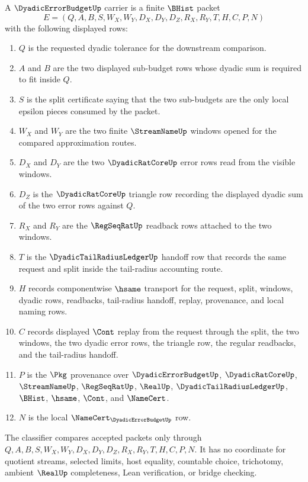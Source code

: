 \begin{definition}
\label{def:dyadic-error-budget-carrier}
A $\DyadicErrorBudgetUp$ carrier is a finite $\BHist$ packet
$$
E=(Q,A,B,S,W_X,W_Y,D_X,D_Y,D_Z,R_X,R_Y,T,H,C,P,N)
$$
with the following displayed rows:
\begin{enumerate}
\item $Q$ is the requested dyadic tolerance for the downstream comparison.
\item $A$ and $B$ are the two displayed sub-budget rows whose dyadic sum is required to fit inside $Q$.
\item $S$ is the split certificate saying that the two sub-budgets are the only local epsilon pieces consumed by the packet.
\item $W_X$ and $W_Y$ are the two finite $\StreamNameUp$ windows opened for the compared approximation routes.
\item $D_X$ and $D_Y$ are the two $\DyadicRatCoreUp$ error rows read from the visible windows.
\item $D_Z$ is the $\DyadicRatCoreUp$ triangle row recording the displayed dyadic sum of the two error rows against $Q$.
\item $R_X$ and $R_Y$ are the $\RegSeqRatUp$ readback rows attached to the two windows.
\item $T$ is the $\DyadicTailRadiusLedgerUp$ handoff row that records the same request and split inside the tail-radius accounting route.
\item $H$ records componentwise $\hsame$ transport for the request, split, windows, dyadic rows, readbacks, tail-radius handoff, replay, provenance, and local naming rows.
\item $C$ records displayed $\Cont$ replay from the request through the split, the two windows, the two dyadic error rows, the triangle row, the regular readbacks, and the tail-radius handoff.
\item $P$ is the $\Pkg$ provenance over $\DyadicErrorBudgetUp$, $\DyadicRatCoreUp$, $\StreamNameUp$, $\RegSeqRatUp$, $\RealUp$, $\DyadicTailRadiusLedgerUp$, $\BHist$, $\hsame$, $\Cont$, and $\NameCert$.
\item $N$ is the local $\NameCert_{\DyadicErrorBudgetUp}$ row.
\end{enumerate}
The classifier compares accepted packets only through $Q,A,B,S,W_X,W_Y,D_X,D_Y,D_Z,R_X,R_Y,T,H,C,P,N$. It has no coordinate for quotient streams, selected limits, host equality, countable choice, trichotomy, ambient $\RealUp$ completeness, Lean verification, or bridge checking.
\end{definition}

